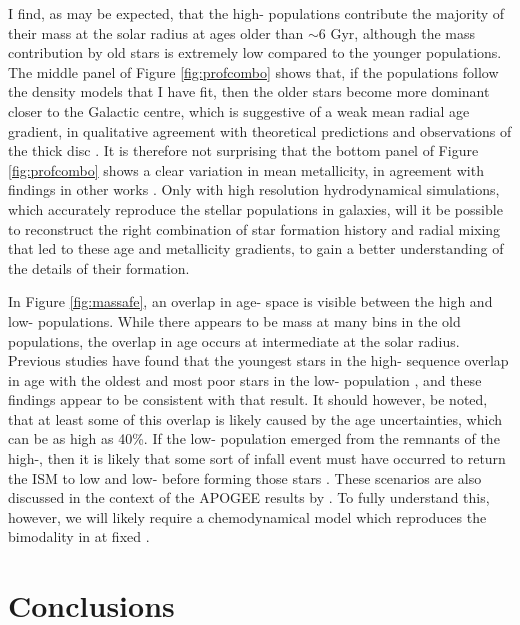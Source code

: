 I find, as may be expected, that the high-\afe{} populations contribute the majority of their mass at the solar radius at ages older than $\sim 6$ Gyr, although the mass contribution by old stars is extremely low compared to the younger populations. The middle panel of Figure \ref{fig:profcombo} shows that, if the populations follow the density models that I have fit, then the older stars become more dominant closer to the Galactic centre, which is suggestive of a weak mean radial age gradient, in qualitative agreement with theoretical predictions \citep[e.g.][]{2015ApJ...804L...9M} and observations of the thick disc \citep[e.g.][]{2016arXiv160901168M}. It is therefore not surprising that the bottom panel of Figure \ref{fig:profcombo} shows a clear variation in mean metallicity, in agreement with findings in other works \citep[e.g.][]{2012ApJ...746..149C,2016arXiv160804951A,2015ApJ...808..132H}. Only with high resolution hydrodynamical simulations, which accurately reproduce the stellar populations in galaxies, will it be possible to reconstruct the right combination of star formation history and radial mixing that led to these age and metallicity gradients, to gain a better understanding of the details of their formation.

In Figure \ref{fig:massafe}, an overlap in age-\feh{} space is visible between the high and low-\afe{} populations. While there appears to be mass at many \feh{} bins in the old populations, the overlap in age occurs at intermediate \feh{} at the solar radius. Previous studies have found that the youngest stars in the high-\afe{} sequence overlap in age with the oldest and most \feh{} poor stars in the low-\afe{} population \citep[e.g.][]{2013A&A...560A.109H}, and these findings appear to be consistent with that result. It should however, be noted, that at least some of this overlap is likely caused by the age uncertainties, which can be as high as 40\%. If the low-\afe{} population emerged from the remnants of the high-\afe{}, then it is likely that some sort of infall event must have occurred to return the ISM to low \feh{} and low-\afe{} before forming those stars \citep[as expressed by, e.g.,][]{1997ApJ...477..765C}. These scenarios are also discussed in the context of the APOGEE results by \citet{2014ApJ...796...38N}. To fully understand this, however, we will likely require a chemodynamical model which reproduces the bimodality in \afe{} at fixed \feh{}.

\section{Conclusions}
\label{sec:conclusionsa}

